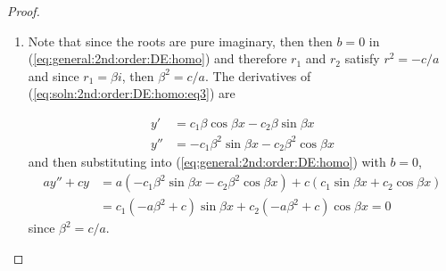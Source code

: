 \begin{proof}
\begin{enumerate}
\item Note that since the roots are pure imaginary, then then $b=0$ in (\ref{eq:general:2nd:order:DE:homo}) and therefore $r_1$ and $r_2$ satisfy $r^2=-c/a$ and since $r_1=\beta i$, then $\beta^2=c/a$.  The derivatives of (\ref{eq:soln:2nd:order:DE:homo:eq3}) are

\begin{align*}
y' & = c_1 \beta \cos \beta x - c_2 \beta \sin \beta x \\
y'' & = - c_1 \beta^2 \sin \beta x  -c_2 \beta^2 \cos \beta x
\end{align*}
and then substituting into (\ref{eq:general:2nd:order:DE:homo}) with $b=0$,
%
\begin{align*}
ay'' + c y & = a (-c_1 \beta^2 \sin \beta x - c_2 \beta^2 \cos \beta x)  + c ( c_1 \sin \beta x  +c_2 \cos \beta x ) \\
& = c_1 (-a\beta^2  + c) \sin \beta x + c_2 (-a\beta^2 +c) \cos \beta x =0
\end{align*}
since $\beta^2=c/a$.




\end{enumerate}
\end{proof}
